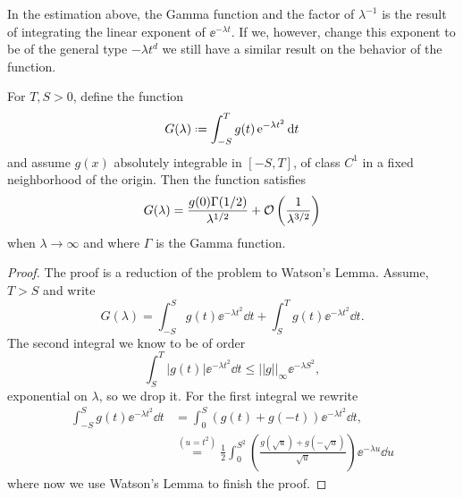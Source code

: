 In the estimation above, the Gamma function and the factor of $\lambda^{-1}$ is the result of integrating the linear exponent of $\ee^{-\lambda t}$. If we, however, change this exponent to be of the general type $-\lambda t^d$ we still have a similar result on the behavior of the function.

\begin{proposicao}		\label{prop: cor watson}
	For $T, S > 0$, define the function
	\begin{equation}
		G(\lambda) \deff \int_{-S}^{T} g(t) \ee^{-\lambda t^2} \dd t
	\end{equation}
	and assume $g(x)$ absolutely integrable in $[-S, T]$, of class $C^1$ in a fixed neighborhood of the origin. Then the function satisfies
	\begin{equation}
		G(\lambda) = \frac{g(0) \Gamma(1/2)}{\lambda^{1/2}} + \mathcal{O} \left(\frac{1}{\lambda^{3/2}} \right)
	\end{equation}
	when $\lambda \rightarrow \infty$ and where $\Gamma$ is the Gamma function.
\end{proposicao}

\begin{proof}
	The proof is a reduction of the problem to Watson's Lemma. Assume, $T>S$ and write
	\begin{equation}
		G(\lambda) = \int_{-S}^{S} g(t) \ee^{-\lambda t^2} \dd t + \int_{S}^{T} g(t) \ee^{-\lambda t^2} \dd t.
	\end{equation}
	The second integral we know to be of order
	\begin{equation}
		\int_{S}^{T} |g(t)| \ee^{-\lambda t^2} \dd t \leq ||g||_{\infty} \ee^{-\lambda S^2},
	\end{equation}
	exponential on $\lambda$, so we drop it. For the first integral we rewrite
		\begin{align}
			\int_{-S}^{S} g(t) \ee^{-\lambda t^2} \dd t & = \int_{0}^{S} (g(t) + g(-t)) \ee^{-\lambda t^2}\dd t, \\
			& \stackrel{(u= t^2)}{=} \frac{1}{2} \int_{0}^{S^2} \left(\frac{g\left(\sqrt{u}\right) + g\left(-\sqrt{u}\right)}{\sqrt{u}}\right) \ee^{-\lambda u} \dd u
		\end{align}
	where now we use Watson's Lemma to finish the proof.
\end{proof}

